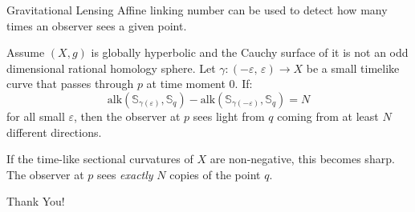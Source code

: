 \documentclass{beamer}
\begin{document}
    \begin{frame}{Gravitational Lensing}
        Affine linking number can be used to detect how many times an observer
        sees a given point.
        \begin{theorem}[Chernov, M., 2023]
            Assume $(X, g)$ is globally hyperbolic and the Cauchy surface
            of it is not an odd dimensional rational homology sphere.
            Let $\gamma:(-\varepsilon,\,\varepsilon)\rightarrow{X}$
            be a small timelike curve that passes through $p$ at time moment 0.
            If:
            \begin{equation}
                \textrm{alk}(\mathbb{S}_{\gamma(\varepsilon)}, \mathbb{S}_{q})-
                \textrm{alk}(\mathbb{S}_{\gamma(-\varepsilon)}, \mathbb{S}_{q})
                =N
            \end{equation}
            for all small $\varepsilon$, then the observer at $p$ sees light
            from $q$ coming from at least $N$ different directions.
        \end{theorem}
        If the time-like sectional curvatures of $X$ are non-negative, this
        becomes sharp. The observer at $p$ sees \textit{exactly} $N$ copies of
        the point $q$.
    \end{frame}
    \begin{frame}
        \begin{center}
            Thank You!
        \end{center}
    \end{frame}
\end{document}
